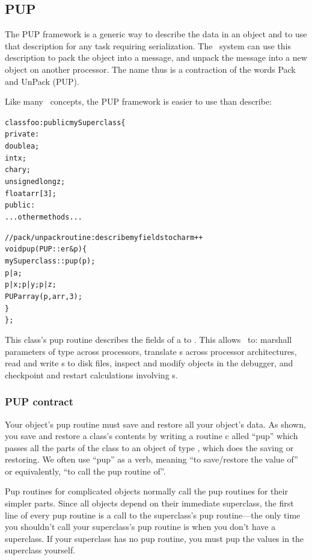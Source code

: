 \subsection{PUP}

\label{sec:pup}

The  PUP framework is a generic way to describe the data in an object and to use that description for any task requiring serialization.
The \charmpp\ system can use this description to pack the object 
into a message, and unpack the message into a new object on another 
processor. 
The name thus is a contraction of the words Pack and UnPack (PUP). 

Like many \CC\ concepts, the PUP framework is easier to use than 
describe: 

\begin{alltt}
class foo : public mySuperclass \{
 private:
    double a;
    int x;
    char y;
    unsigned long z;
    float arr[3];
 public:
    ...other methods...

    //pack/unpack routine: describe my fields to charm++
    void pup(PUP::er &p) \{
      mySuperclass::pup(p);
      p|a;
      p|x; p|y; p|z;
      PUParray(p,arr,3);
    \}
\};
\end{alltt}

This class's pup routine describes the fields of a  to \charmpp{}.
This allows \charmpp\ to: marshall parameters of type  across processors,
translate s across processor architectures, read and write s
to disk files, inspect and modify  objects in the debugger, and 
checkpoint and restart calculations involving s.



\subsubsection{PUP contract}

Your object's pup routine must save and restore all your object's data.
As shown, you save and restore a class's contents by writing a routine c
alled ``pup'' which passes all the parts of the class to an object of type 
 , which does the saving or restoring.  
We often use ``pup'' as a verb, meaning ``to save/restore the value of''
or equivalently, ``to call the pup routine of''.

Pup routines for complicated objects normally call the pup routines
for their simpler parts.  Since all objects depend on their immediate
superclass, the first line of every pup routine is a call to the 
superclass's pup routine---the only time you shouldn't call your superclass's
pup routine is when you don't have a superclass.  If your superclass has
no pup routine, you must pup the values in the superclass yourself.


